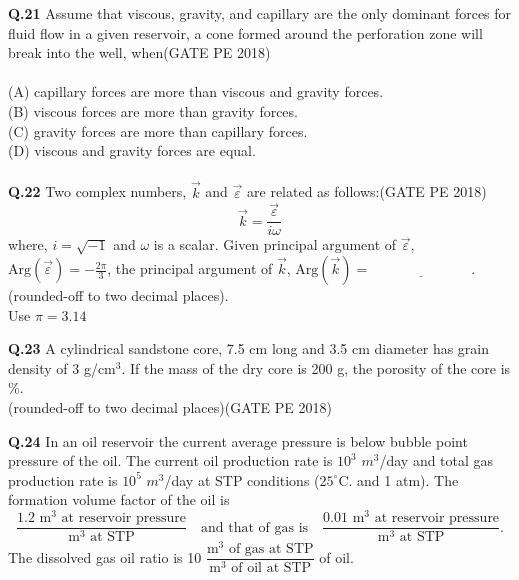 \documentclass[12pt,a4paper]{article}
\begin{document}
\noindent
\textbf{Q.21} Assume that viscous, gravity, and capillary are the only dominant forces for fluid flow in a
given reservoir, a cone formed around the perforation zone will break into the well, when\hfill(GATE PE 2018)\\\\
(A) capillary forces are more than viscous and gravity forces.\\
(B) viscous forces are more than gravity forces.\\
(C) gravity forces are more than capillary forces.\\
(D) viscous and gravity forces are equal.\\\\

\noindent\textbf{Q.22} Two complex numbers, $\vec{k}$ and $\vec{\varepsilon}$ are related as follows:\hfill(GATE PE 2018)
\[
\vec{k} = \frac{\vec{\varepsilon}}{i\omega}
\]
where, $i = \sqrt{-1}$ and $\omega$ is a scalar. Given principal argument of $\vec{\varepsilon}$, $\text{Arg}(\vec{\varepsilon}) = -\frac{2\pi}{3}$, the principal argument of $\vec{k}$, $\text{Arg}(\vec{k}) = \underline{\hspace{3cm}}$. (rounded-off to two decimal places). \\
Use $\pi = 3.14$

\vspace{1cm}

\noindent\textbf{Q.23} A cylindrical sandstone core, 7.5 cm long and 3.5 cm diameter has grain density of 3 g/cm$^3$. If the mass of the dry core is 200 g, the porosity of the core is \underline{\hspace{3cm}} \%.\\
(rounded-off to two decimal places)\hfill(GATE PE 2018)

\vspace{1cm}

\noindent\textbf{Q.24} In an oil reservoir the current average pressure is below bubble point pressure of the oil. The current oil production rate is $10^3$ $m^3$/day and total gas production rate is $10^5$ $m^3$/day at STP conditions ($25^\circ\text{C}$. and 1 atm). The formation volume factor of the oil is
\[
\frac{1.2 \text{ m}^3 \text{ at reservoir pressure}}{\text{m}^3 \text{ at STP}} \quad \text{and that of gas is} \quad \frac{0.01 \text{ m}^3 \text{ at reservoir pressure}}{\text{m}^3 \text{ at STP}}.
\]
The dissolved gas oil ratio is 10 $\dfrac{\text{m}^3 \text{ of gas at STP}}{\text{m}^3 \text{ of oil at STP}}$ of oil.
\end{document}
